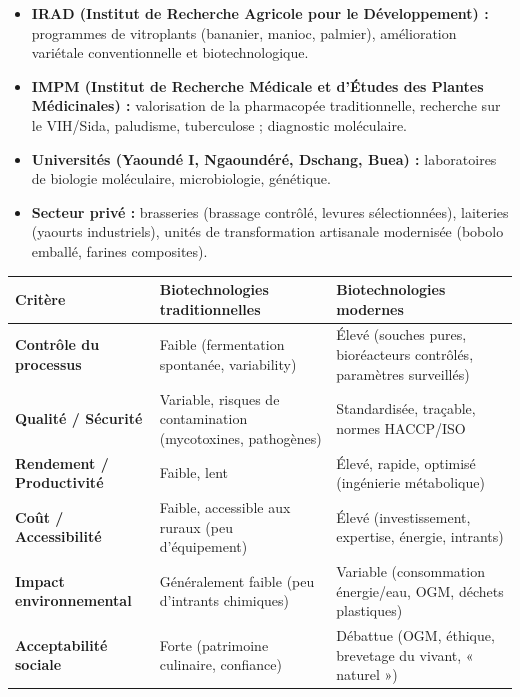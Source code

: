 \documentclass[11pt]{article}
\newcounter{popsec}
\newcounter{popsub}
\newcommand{\courssub}[1]{%
  \stepcounter{popsub}%
  \par\vspace{9pt}\noindent{\popxbold\fontsize{11.5}{13}\selectfont\color{popink}{\color{poporange}\thepopsec.\thepopsub}\hspace{6pt}#1}\par\nopagebreak\vspace{4pt}
}
\begin{document}
\begin{savaistu}
\begin{itemize}
    \item \textbf{IRAD (Institut de Recherche Agricole pour le Développement) :} programmes de vitroplants (bananier, manioc, palmier), amélioration variétale conventionnelle et biotechnologique.
    \item \textbf{IMPM (Institut de Recherche Médicale et d'Études des Plantes Médicinales) :} valorisation de la pharmacopée traditionnelle, recherche sur le VIH/Sida, paludisme, tuberculose ; diagnostic moléculaire.
    \item \textbf{Universités (Yaoundé I, Ngaoundéré, Dschang, Buea) :} laboratoires de biologie moléculaire, microbiologie, génétique.
    \item \textbf{Secteur privé :} brasseries (brassage contrôlé, levures sélectionnées), laiteries (yaourts industriels), unités de transformation artisanale modernisée (bobolo emballé, farines composites).
\end{itemize}
\end{savaistu}

\courssub{Avantages, limites et débats}

\begin{propriete}
\begin{center}
\begin{tabularx}{\linewidth}{|l|X|X|}
\hline
\rowcolor{popblueL} \textbf{Critère} & \textbf{Biotechnologies traditionnelles} & \textbf{Biotechnologies modernes} \\
\hline
\textbf{Contrôle du processus} & Faible (fermentation spontanée, variability) & Élevé (souches pures, bioréacteurs contrôlés, paramètres surveillés) \\
\hline
\textbf{Qualité / Sécurité} & Variable, risques de contamination (mycotoxines, pathogènes) & Standardisée, traçable, normes HACCP/ISO \\
\hline
\textbf{Rendement / Productivité} & Faible, lent & Élevé, rapide, optimisé (ingénierie métabolique) \\
\hline
\textbf{Coût / Accessibilité} & Faible, accessible aux ruraux (peu d'équipement) & Élevé (investissement, expertise, énergie, intrants) \\
\hline
\textbf{Impact environnemental} & Généralement faible (peu d'intrants chimiques) & Variable (consommation énergie/eau, OGM, déchets plastiques) \\
\hline
\textbf{Acceptabilité sociale} & Forte (patrimoine culinaire, confiance) & Débattue (OGM, éthique, brevetage du vivant, « naturel ») \\
\hline
\end{tabularx}
\end{center}
\end{propriete}
\end{document}
